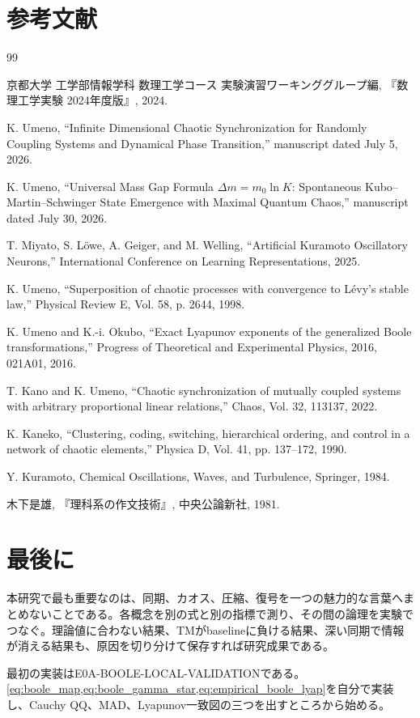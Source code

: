\documentclass[a4paper,11pt,oneside,openany]{ltjsbook}
\newcommand{\EID}[1]{\textsf{#1}}
\begin{document}
\backmatter
\chapter*{参考文献}
\begin{thebibliography}{99}

京都大学 工学部情報学科 数理工学コース 実験演習ワーキンググループ編,
『数理工学実験 2024年度版』, 2024.

K. Umeno,
``Infinite Dimensional Chaotic Synchronization for Randomly Coupling Systems and Dynamical Phase Transition,''
manuscript dated July 5, 2026.

K. Umeno,
``Universal Mass Gap Formula $\Delta m=m_0\ln K$: Spontaneous Kubo--Martin--Schwinger State Emergence with Maximal Quantum Chaos,''
manuscript dated July 30, 2026.

T. Miyato, S. L\"owe, A. Geiger, and M. Welling,
``Artificial Kuramoto Oscillatory Neurons,''
International Conference on Learning Representations, 2025.

K. Umeno,
``Superposition of chaotic processes with convergence to L\'evy's stable law,''
Physical Review E, Vol. 58, p. 2644, 1998.

K. Umeno and K.-i. Okubo,
``Exact Lyapunov exponents of the generalized Boole transformations,''
Progress of Theoretical and Experimental Physics, 2016, 021A01, 2016.

T. Kano and K. Umeno,
``Chaotic synchronization of mutually coupled systems with arbitrary proportional linear relations,''
Chaos, Vol. 32, 113137, 2022.

K. Kaneko,
``Clustering, coding, switching, hierarchical ordering, and control in a network of chaotic elements,''
Physica D, Vol. 41, pp. 137--172, 1990.

Y. Kuramoto,
Chemical Oscillations, Waves, and Turbulence,
Springer, 1984.

木下是雄,
『理科系の作文技術』,
中央公論新社, 1981.

\end{thebibliography}

\chapter*{最後に}

本研究で最も重要なのは、同期、カオス、圧縮、復号を一つの魅力的な言葉へまとめないことである。各概念を別の式と別の指標で測り、その間の論理を実験でつなぐ。理論値に合わない結果、TMがbaselineに負ける結果、深い同期で情報が消える結果も、原因を切り分けて保存すれば研究成果である。

最初の実装は\EID{E0A-BOOLE-LOCAL-VALIDATION}である。\cref{eq:boole_map,eq:boole_gamma_star,eq:empirical_boole_lyap}を自分で実装し、Cauchy QQ、MAD、Lyapunov一致図の三つを出すところから始める。
\end{document}
